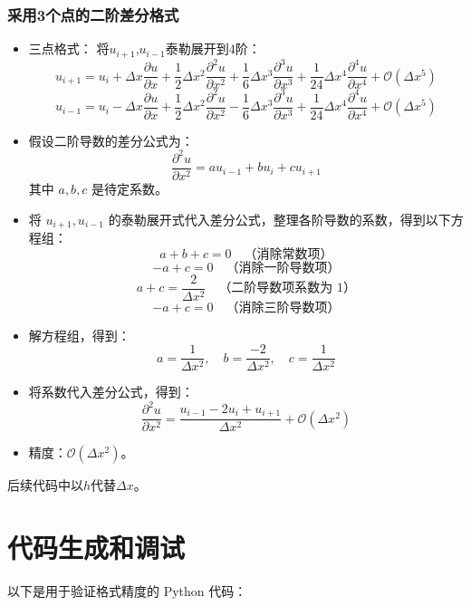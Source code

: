 \documentclass[12pt,a4paper]{article}
\begin{document}
\subsubsection{采用3个点的二阶差分格式}
\begin{itemize}
    \item 三点格式：
    将$u_{i+1}$,$u_{i-1}$泰勒展开到4阶：
    \[u_{i+1} = u_i + \Delta x \frac{\partial u}{\partial x} + \frac{1}{2} \Delta x^2 \frac{\partial^2 u}{\partial x^2} + \frac{1}{6} \Delta x^3 \frac{\partial^3 u}{\partial x^3} + \frac{1}{24} \Delta x^4 \frac{\partial^4 u}{\partial x^4} + \mathcal{O}(\Delta x^5)\]
    \[u_{i-1} = u_i - \Delta x \frac{\partial u}{\partial x} + \frac{1}{2} \Delta x^2 \frac{\partial^2 u}{\partial x^2} -\frac{1}{6} \Delta x^3 \frac{\partial^3 u}{\partial x^3} + \frac{1}{24} \Delta x^4 \frac{\partial^4 u}{\partial x^4} + \mathcal{O}(\Delta x^5)\]
    \item 假设二阶导数的差分公式为：
    \[
    \frac{\partial^2 u}{\partial x^2} = a u_{i-1} + b u_i + c u_{i+1}
    \]
    其中 \( a, b, c \) 是待定系数。

    \item 将 \( u_{i+1}, u_{i-1} \) 的泰勒展开式代入差分公式，整理各阶导数的系数，得到以下方程组：
    \[
    a + b + c  = 0 \quad \text{（消除常数项）}
    \]
    \[
    -a + c  = 0 \quad \text{（消除一阶导数项）}
    \]
    \[
    a + c = \frac{2}{\Delta x^2} \quad \text{（二阶导数项系数为 1）}
    \]
    \[
    -a + c= 0 \quad \text{（消除三阶导数项）}
    \]


    \item 解方程组，得到：
    \[
    a = \frac{1}{\Delta x^2}, \quad b = \frac{-2}{\Delta x^2}, \quad c = \frac{1}{\Delta x^2}
    \]

    \item 将系数代入差分公式，得到：
    \[
    \frac{\partial^2 u}{\partial x^2} = \frac{u_{i-1} - 2 u_i + u_{i+1} }{\Delta x^2} + \mathcal{O}(\Delta x^2)
    \]

    \item 精度：$\mathcal{O}(\Delta x^2)$。


\end{itemize}
后续代码中以$h$代替$\Delta x$。

\section{代码生成和调试}
以下是用于验证格式精度的 Python 代码：


\end{document}
